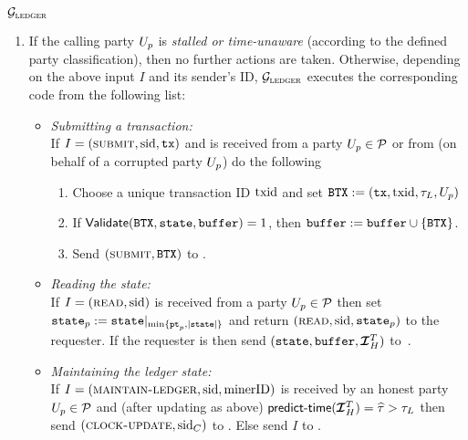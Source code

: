 \begin{systembox}{$\mathcal{G}_{\textsc{ledger}}$}
\begin{enumerate}
		\item If the calling party ${U_p}$ is \emph{stalled or time-unaware} (according to the defined party classification), then no further actions are taken. Otherwise, depending on the above input $I$ and its sender's ID,  $\mathcal{G}_{\textsc{ledger}}$
		executes the corresponding code from the following list:
		
		\begin{itemize}
			\let\labelitemi\labelitemii
			
			\item  \emph{Submitting a transaction:}\\
			If $I=(\textsc{submit}, \text{sid},\texttt{tx})$ and is received from a party ${U_p} \in \mathcal{P}$ or from \Adv (on behalf of a corrupted party ${U_p}$) do the following%
			\begin{enumerate}\setlength\itemsep{1ex}
				\item Choose a unique transaction ID $\text{txid}$ and set $\texttt{BTX}:=(\texttt{tx},\text{txid},\tau_L,{U_p})$
				\item If $\textsf{Validate}(\texttt{BTX},\texttt{state},\texttt{buffer})=1$,  then $\texttt{buffer}:=\texttt{buffer}\cup\{\texttt{BTX}\}$.
				\item Send $(\textsc{submit}, \texttt{BTX})$ to \Adv.%
			\end{enumerate}
			
			\item \emph{Reading the state:}\\ If $I=(\textsc{read}, \text{sid})$ is received from a party ${U_p} \in \mathcal{P}$ then set $\texttt{state}_p:= \texttt{state}|_{\min\{\texttt{pt}_p,|\texttt{state}|\}}$ and return $(\textsc{read}, \text{sid}, \texttt{state}_p)$ to the requester. If the requester is \Adv then send $(\state,\buffer,\TIH)$ to~\Adv.%
			
			\item \emph{Maintaining the ledger state:}\\
			If $I=(\textsc{maintain-ledger},\text{sid}, \text{minerID})$ is received by an honest party ${U_p}\in\mathcal{P}$ and  (after updating \TIH  as above) $\vsync(\TIH)=\hat{\tau}>\LFtau$ 
			then send $(\textsc{clock-update}, \text{sid}_C)$ to \Fclock. Else send $I$ to \Adv.%
			

\end{itemize}
\end{enumerate}
\end{systembox}
